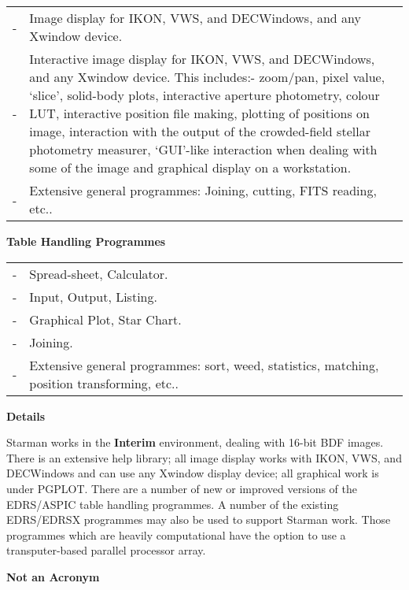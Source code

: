\hspace*{3ex} \begin{tabular}{lp{5.5in}}
- & Image display for IKON, VWS, and DECWindows, and any Xwindow device. \\
- & Interactive image display for IKON, VWS, and DECWindows, and any Xwindow 
    device. This includes:- zoom/pan, pixel value, `slice', 
    solid-body plots, interactive aperture photometry, colour LUT, interactive 
    position file making, plotting of positions on image, interaction with 
    the output of the crowded-field stellar photometry measurer, `GUI'-like 
    interaction when dealing with some of the image and graphical display 
    on a workstation.  \\
- & Extensive general programmes: Joining, cutting, FITS reading, etc.. \\
\end{tabular}

{\vspace*{-1mm} \large \bf Table Handling Programmes \vspace*{-1mm} }

\hspace*{3ex} \begin{tabular}{lp{5.5in}}
- & Spread-sheet, Calculator. \\
- & Input, Output, Listing. \\
- & Graphical Plot, Star Chart. \\
- & Joining. \\
- & Extensive general programmes: sort, weed, statistics, 
    matching, position transforming, etc.. \\
\end{tabular}

{\vspace*{-0.5mm} \large \bf Details \vspace*{-1mm} }

Starman works in the {\bf Interim} environment, dealing with 16-bit
BDF images. There is an extensive help library; all image display works
with IKON, VWS, and DECWindows and can use any Xwindow display device; all
graphical work is under PGPLOT. There are a number of new or improved
versions of the EDRS/ASPIC table handling programmes. A number of the
existing EDRS/EDRSX programmes may also be used to support Starman work. Those
programmes which are heavily computational have the option to use a
transputer-based parallel processor array. 


{\vspace*{-1mm} \large \bf Not an Acronym \vspace*{-1mm} }

